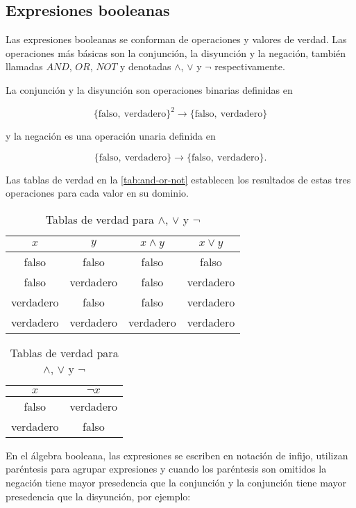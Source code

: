 \subsection{Expresiones booleanas}
\label{sec:expresiones-booleanas}

Las expresiones booleanas se conforman de operaciones y valores de verdad. Las operaciones más básicas son la conjunción, la disyunción y la negación, también llamadas $ AND $, $ OR $, $ NOT $ y denotadas $ \land $, $ \lor $ y $ \lnot $ respectivamente.

La conjunción y la disyunción son operaciones binarias definidas en

\[ \{ \mathrm{falso},\ \mathrm{verdadero} \}^{2} \to \{ \mathrm{falso},\ \mathrm{verdadero} \} \]

y la negación es una operación unaria definida en

\[ \{ \mathrm{falso},\ \mathrm{verdadero} \} \to \{ \mathrm{falso},\ \mathrm{verdadero} \}. \]

Las tablas de verdad en la \autoref{tab:and-or-not} establecen los resultados de estas tres operaciones para cada valor en su dominio.

\begin{table}[!htbp]
  \centering
  \small
  \begin{tabular}{|c|c|c|c|}
    \hline
    $ x $ & $ y $ & $ x \land y $ & $ x \lor y $ \\ [0.5ex]
    \hline\hline
    falso & falso & falso & falso \\
    falso & verdadero & falso & verdadero \\
    verdadero & falso & falso & verdadero \\
    verdadero & verdadero & verdadero & verdadero \\
    \hline
  \end{tabular}
  \hfill
  \begin{tabular}{|c|c|}
    \hline
    $ x $ & $ \lnot x $ \\ [0.5ex]
    \hline\hline
    falso & verdadero  \\
    verdadero & falso \\
    \hline
  \end{tabular}
  \caption{Tablas de verdad para $ \land $, $ \lor $ y $ \lnot $}
  \label{tab:and-or-not}
\end{table}

En el álgebra booleana, las expresiones se escriben en notación de infijo, utilizan paréntesis para agrupar expresiones y cuando los paréntesis son omitidos la negación tiene mayor presedencia que la conjunción y la conjunción tiene mayor presedencia que la disyunción, por ejemplo:

